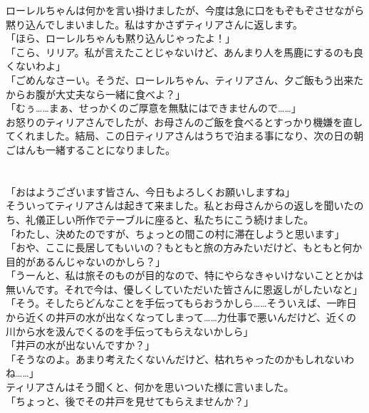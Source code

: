 \documentclass[oneside, a4paper]{jsbook}
\begin{document}
ローレルちゃんは何かを言い掛けましたが、今度は急に口をもぞもぞさせながら黙り込んでしまいました。私はすかさずティリアさんに返します。\\

\noindent
「ほら、ローレルちゃんも黙り込んじゃったよ！」\\
「こら、リリア。私が言えたことじゃないけど、あんまり人を馬鹿にするのも良くないわよ」\\
「ごめんなさーい。そうだ、ローレルちゃん、ティリアさん、夕ご飯もう出来たからお腹が大丈夫なら一緒に食べよ？」\\
「むぅ……まぁ、せっかくのご厚意を無駄にはできませんので……」\\

お怒りのティリアさんでしたが、お母さんのご飯を食べるとすっかり機嫌を直してくれました。結局、この日ティリアさんはうちで泊まる事になり、次の日の朝ごはんも一緒することになりました。\\\\\\

\noindent
「おはようございます皆さん、今日もよろしくお願いしますね」\\

そういってティリアさんは起きて来ました。私とお母さんからの返しを聞いたのち、礼儀正しい所作でテーブルに座ると、私たちにこう続けました。\\

\noindent
「わたし、決めたのですが、ちょっとの間この村に滞在しようと思います」\\
「おや、ここに長居してもいいの？もともと旅の方みたいだけど、もともと何か目的があるんじゃないのかしら？」\\
「うーんと、私は旅そのものが目的なので、特にやらなきゃいけないこととかは無いんです。それで今は、優しくしていただいた皆さんに恩返しがしたいなと」\\
「そう。そしたらどんなことを手伝ってもらおうかしら……そういえば、一昨日から近くの井戸の水が出なくなってしまって……力仕事で悪いんだけど、近くの川から水を汲んでくるのを手伝ってもらえないかしら」\\
「井戸の水が出ないんですか？」\\
「そうなのよ。あまり考えたくないんだけど、枯れちゃったのかもしれないわね……」\\

ティリアさんはそう聞くと、何かを思いついた様に言いました。\\

\noindent
「ちょっと、後でその井戸を見せてもらえませんか？」\\\\\\
\end{document}
